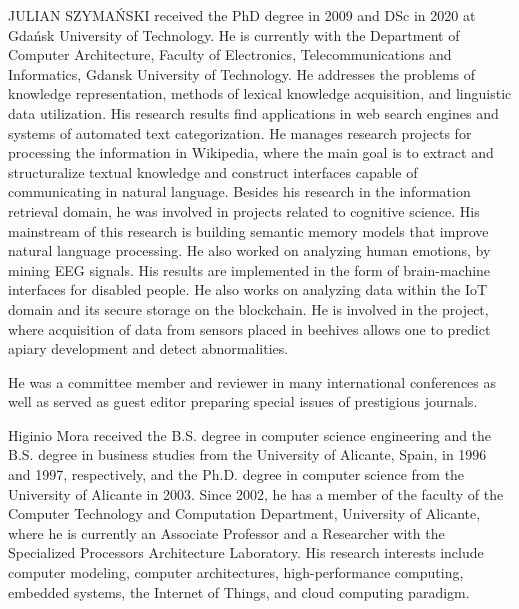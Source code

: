 \documentclass{ieeeaccess}
\begin{document}
\begin{IEEEbiography}{JULIAN SZYMA{\'N}SKI}  received the PhD degree in 2009 and DSc in 2020 at Gdańsk University of Technology.
He is currently with the Department of Computer
Architecture, Faculty of Electronics, Telecommunications and Informatics, Gdansk University of Technology. He addresses the problems of knowledge representation, methods of lexical knowledge acquisition, and linguistic data utilization.
His research results find applications in web search engines and systems of automated text categorization. He manages research projects for processing the information in Wikipedia, where the main goal is to extract and structuralize textual knowledge and construct interfaces capable of communicating in natural language. Besides his research in the information retrieval domain, he was involved in projects related to cognitive science. His mainstream of this research is building semantic memory models that improve natural language processing. He also worked on analyzing human emotions, by mining EEG signals. His results are implemented in the form of brain-machine interfaces for disabled people. He also works on analyzing data within the IoT domain and its secure storage on the blockchain. 
He is involved in the project, where acquisition of data from sensors placed in beehives  allows one to predict apiary development and detect abnormalities. 

He was a committee member and reviewer in  many international
conferences as well as served as guest editor preparing special issues of prestigious journals. 
\end{IEEEbiography}

\begin{IEEEbiography}{Higinio Mora} received the B.S. degree in computer science engineering and the B.S. degree in business studies from the University of Alicante, Spain, in 1996 and 1997, respectively, and the Ph.D. degree in computer science from the University of Alicante in 2003. Since 2002, he has a member of the faculty of the Computer Technology and Computation Department, University of Alicante, where he is currently an Associate Professor and a Researcher with the Specialized Processors Architecture Laboratory. His research interests include computer modeling, computer architectures, high-performance computing, embedded systems, the Internet of Things, and cloud computing paradigm.
\end{IEEEbiography}
\end{document}
